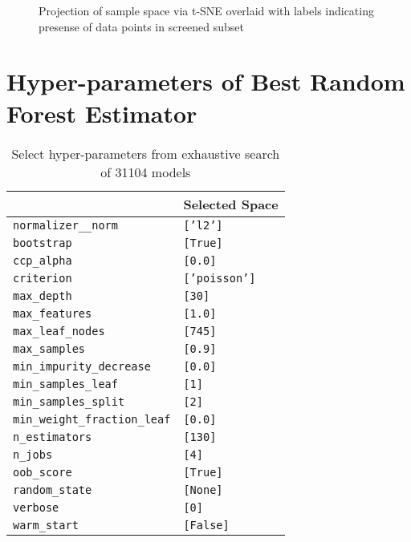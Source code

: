  
\begin{figure}[htbp]
\centering

\caption{\label{fig:chosen} Projection of sample space via t-SNE overlaid with labels indicating presense of data points in screened subset}
\end{figure}

\section*{Hyper-parameters of Best Random Forest Estimator}
\label{sec:org4aa92f2}
\begin{table}[htbp]
\caption{\label{tbl:rfrHPO} Select hyper-parameters from exhaustive search of 31104 models}
\centering
\begin{tabular}{ll}
 & Selected Space\\[0pt]
\hline
\texttt{normalizer\_\_norm} & \texttt{['l2']}\\[0pt]
\texttt{bootstrap} & \texttt{[True]}\\[0pt]
\texttt{ccp\_alpha} & \texttt{[0.0]}\\[0pt]
\texttt{criterion} & \texttt{['poisson']}\\[0pt]
\texttt{max\_depth} & \texttt{[30]}\\[0pt]
\texttt{max\_features} & \texttt{[1.0]}\\[0pt]
\texttt{max\_leaf\_nodes} & \texttt{[745]}\\[0pt]
\texttt{max\_samples} & \texttt{[0.9]}\\[0pt]
\texttt{min\_impurity\_decrease} & \texttt{[0.0]}\\[0pt]
\texttt{min\_samples\_leaf} & \texttt{[1]}\\[0pt]
\texttt{min\_samples\_split} & \texttt{[2]}\\[0pt]
\texttt{min\_weight\_fraction\_leaf} & \texttt{[0.0]}\\[0pt]
\texttt{n\_estimators} & \texttt{[130]}\\[0pt]
\texttt{n\_jobs} & \texttt{[4]}\\[0pt]
\texttt{oob\_score} & \texttt{[True]}\\[0pt]
\texttt{random\_state} & \texttt{[None]}\\[0pt]
\texttt{verbose} & \texttt{[0]}\\[0pt]
\texttt{warm\_start} & \texttt{[False]}\\[0pt]
\end{tabular}
\end{table}
